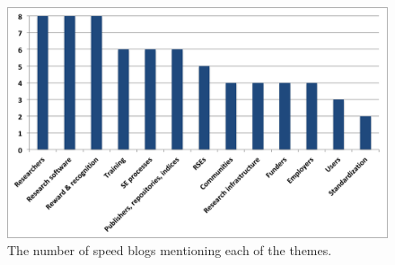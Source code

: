 \documentclass[11pt,letterpaper]{article}
\begin{document}
\begin{figure}[h!]
  \includegraphics[width=\textwidth]{speed_blogs_categories_distribution.png}
  \caption{The number of speed blogs mentioning each of the themes.}
  \label{fig:speedblogs}
\end{figure}


\end{document}
